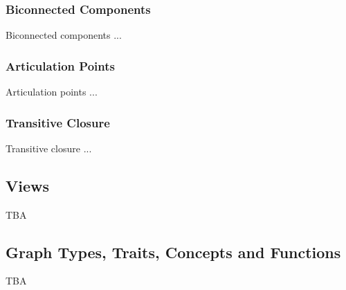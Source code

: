 \documentclass[10pt,onecolumn]{article}
\begin{document}
\subsubsection{Biconnected Components}
Biconnected components \cite{REF_} ...

\subsubsection{Articulation Points}
Articulation points \cite{REF_} ...

\subsubsection{Transitive Closure}
Transitive closure \cite{REF_} ...

%

\subsection{Views}
TBA

\subsection{Graph Types, Traits, Concepts and Functions}
TBA
\end{document}
